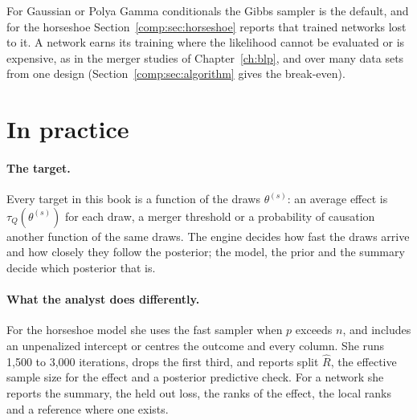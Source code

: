 For Gaussian or Polya Gamma conditionals the Gibbs sampler is the default, and for the horseshoe Section~\ref{comp:sec:horseshoe} reports that trained networks lost to it. A network earns its training where the likelihood cannot be evaluated or is expensive, as in the merger studies of Chapter~\ref{ch:blp}, and over many data sets from one design (Section~\ref{comp:sec:algorithm} gives the break-even).

\section{In practice}

\paragraph{The target.} Every target in this book is a function of the draws $\theta^{(s)}$: an average effect is $\tau_Q(\theta^{(s)})$ for each draw, a merger threshold or a probability of causation another function of the same draws. The engine decides how fast the draws arrive and how closely they follow the posterior; the model, the prior and the summary decide which posterior that is.

\paragraph{What the analyst does differently.} For the horseshoe model she uses the fast sampler when $p$ exceeds $n$, and includes an unpenalized intercept or centres the outcome and every column. She runs 1,500 to 3,000 iterations, drops the first third, and reports split $\hat R$, the effective sample size for the effect and a posterior predictive check. For a network she reports the summary, the held out loss, the ranks of the effect, the local ranks and a reference where one exists.

